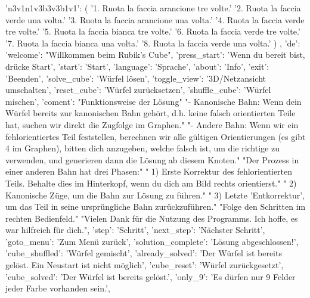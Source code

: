 {{        'n3v1n1v3b3v3b1v1': (
            '1. Ruota la faccia arancione tre volte.\n'
            '2. Ruota la faccia verde una volta.\n'
            '3. Ruota la faccia arancione una volta.\n'
            '4. Ruota la faccia verde tre volte.\n'
            '5. Ruota la faccia bianca tre volte.\n'
            '6. Ruota la faccia verde tre volte.\n'
            '7. Ruota la faccia bianca una volta.\n'
            '8. Ruota la faccia verde una volta.'
        )
    },
    'de': {
        'welcome':         "Willkommen beim Rubik's Cube",
        'press_start':     'Wenn du bereit bist, drücke Start',
        'start':           'Start',
        'language':        'Sprache',
        'about':           'Info',
        'exit':            'Beenden',
        'solve_cube':      'Würfel lösen',
        'toggle_view':     '3D/Netzansicht umschalten',
        'reset_cube':      'Würfel zurücksetzen',
        'shuffle_cube':    'Würfel mischen',
        'coment':          "Funktionsweise der Lösung\n\n"
                            "- Kanonische Bahn: Wenn dein Würfel bereits zur kanonischen Bahn gehört, d.h. keine falsch orientierten Teile hat, suchen wir direkt die Zugfolge im Graphen.\n"
                            "- Andere Bahn: Wenn wir ein fehlorientiertes Teil feststellen, berechnen wir alle gültigen Orientierungen (es gibt 4 im Graphen), bitten dich anzugeben, welche falsch ist, um die richtige zu verwenden, und generieren dann die Lösung ab diesem Knoten.\n\n"
                            "Der Prozess in einer anderen Bahn hat drei Phasen:\n"
                            "  1) Erste Korrektur des fehlorientierten Teils. Behalte dies im Hinterkopf, wenn du dich am Bild rechts orientierst.\n"
                            "  2) Kanonische Züge, um die Bahn zur Lösung zu führen.\n"
                            "  3) Letzte 'Entkorrektur', um das Teil in seine ursprüngliche Bahn zurückzuführen.\n\n"
                            "Folge den Schritten im rechten Bedienfeld.\n\n"
                            "Vielen Dank für die Nutzung des Programms. Ich hoffe, es war hilfreich für dich.\n\n",
        'step':          'Schritt',
        'next_step':       'Nächster Schritt',
        'goto_menu':       'Zum Menü zurück',
        'solution_complete': 'Lösung abgeschlossen!',
        'cube_shuffled':   'Würfel gemischt',
        'already_solved':  'Der Würfel ist bereits gelöst. Ein Neustart ist nicht möglich',
        'cube_reset':      'Würfel zurückgesetzt',
        'cube_solved':     'Der Würfel ist bereits gelöst.',
        'only_9':          'Es dürfen nur 9 Felder jeder Farbe vorhanden sein.',
}}

